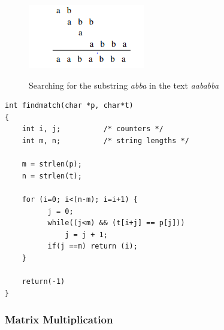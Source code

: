 \begin{figure}[H]
  \centering
     \includegraphics[scale=0.6]{./2_6.png}
  \label{fig:demo-diagram}
  \caption{Searching for the substring \emph{abba} in the text \emph{aababba}}
\end{figure}

\begin{verbatim}
int findmatch(char *p, char*t)
{
    int i, j;          /* counters */
    int m, n;          /* string lengths */

    m = strlen(p);
    n = strlen(t);

    for (i=0; i<(n-m); i=i+1) {
          j = 0;
          while((j<m) && (t[i+j] == p[j]))
              j = j + 1;
          if(j ==m) return (i);
    }

    return(-1)
}
\end{verbatim}


\subsubsection{Matrix Multiplication}